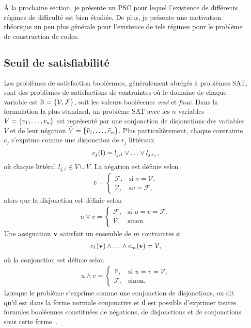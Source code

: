 À la prochaine section, 
je présente un PSC pour lequel l'existence de différents régimes de difficulté 
est bien étudiée. 
De plus, je présente une motivation théorique un peu plus générale pour l'existence de
tels régimes pour le problème de construction de codes.

\subsection{Seuil de satisfiabilité}

Les problèmes de satisfaction booléennes,
généralement abrégés à problèmes SAT,
sont des problèmes de satisfactions de contraintes où le domaine de chaque variable
est $\mathbb B = \qty{\mathcal V, \mathcal F}$,
soit les valeurs booléeenes \textit{vrai} et \textit{faux}.
Dans la formulation la plus standard,
un problème SAT avec les $n$ variables $V = \qty{v_1,\ldots, v_n}$
est représenté par une conjonction de disjonctions des variables $V$ et de leur négation 
$\bar V = \qty{\bar v_1, \ldots, \bar v_n}$.
Plus particulièrement,
chaque contrainte $c_j$ s'exprime comme une disjonction de $r_j$ littéraux
\begin{align}
  c_j(\vb l) = l_{j, 1} \lor \ldots \lor l_{j, r_{j}},
\end{align}
où chaque littéral $l_{j, i} \in V \cup \bar V$.
La négation est définie selon
\begin{align}
  \bar v = 
  \begin{cases}
    \mathcal F, &\text{si } v = \mathcal V, \\
    \mathcal V, &\text{s} v = \mathcal F,
  \end{cases}
\end{align}
alors que la disjonction est définie selon
\begin{align}
  u \lor v = 
  \begin{cases}
    \mathcal F, &\text{si } u = v = \mathcal F, \\
    \mathcal V, &\text{sinon}.
  \end{cases}
\end{align}
Une assignation $\vb v$ satisfait un ensemble de $m$ contraintes si
\begin{align}
  c_1(\vb v) \land \ldots \land c_m(\vb v) = \mathcal V,
\end{align}
où la conjonction est définie selon
\begin{align}
  u \land v = 
  \begin{cases}
    \mathcal V, &\text{si } u = v = \mathcal V, \\
    \mathcal F, &\text{sinon}.
  \end{cases}
\end{align}
Lorsque le problème s'exprime comme une conjonction de disjonctions,
on dit qu'il est dans la forme normale conjonctive
et il est possible d'exprimer toutes formules booléennes constituées de négations,
de disjonctions et de conjonctions sous cette forme~\cite{tseitin_complexity_1983}.

